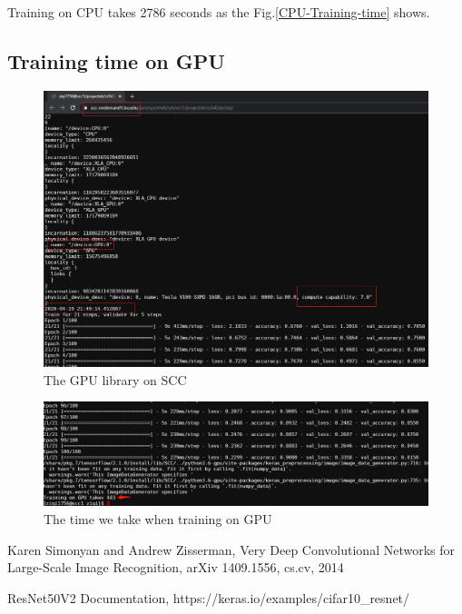 \documentclass[a4paper,12pt]{article}
\begin{document}
Training on CPU takes 2786 seconds as the Fig.\ref{CPU-Training-time} shows.

\subsection{Training time on GPU}

\begin{figure}[H]
  \centering
  \includegraphics[width=14cm]{./images/GPU-lib.png}
     \caption{The GPU library on SCC
             }
        \label{GPU-lib}
\end{figure}

\begin{figure}[H]
  \centering
  \includegraphics[width=15cm]{./images/GPU-Training-time.png}
     \caption{The time we take when training on GPU
             }
        \label{GPU-Training-time}
\end{figure}

\begin{thebibliography}{}

   Karen Simonyan and Andrew Zisserman,
  Very Deep Convolutional Networks for Large-Scale Image Recognition,
  arXiv 1409.1556, cs.cv, 2014

   ResNet50V2 Documentation, https://keras.io/examples/cifar10\_resnet/

\end{thebibliography}
\end{document}
